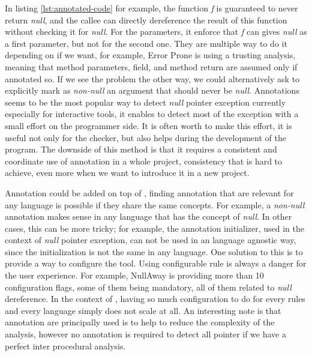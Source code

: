 In listing \ref{lst:annotated-code} for example, the function \emph{f} is guaranteed to never return \emph{null}, and the callee can directly dereference the result of this function without checking it for \emph{null}. 
For the parameters, it enforce that \emph{f} can gives \emph{null} as a first parameter, but not for the second one.\newline
They are multiple way to do it depending on if we want, for example, Error Prone is using a trusting analysis, meaning that method parameters, field, and method return are assumed \nullable{} only if annotated so. 
If we see the problem the other way, we could alternatively ask to explicitly mark as \emph{non-null} an argument that should never be \emph{null}.\newline
Annotations seems to be the most popular way to detect \emph{null} pointer exception currently especially for interactive tools, it enables to detect most of the exception with a small effort on the programmer side. 
It is often worth to make this effort, it is useful not only for the checker, but also helps during the development of the program. 
The downside of this method is that it requires a consistent and coordinate use of annotation in a whole project, consistency that is hard to achieve, even more when we want to introduce it in a new project.

Annotation could be added on top of \slang{}, finding annotation that are relevant for any language is possible if they share the same concepts. 
For example, a \emph{non-null} annotation makes sense in any language that has the concept of \emph{null}. 
In other cases, this can be more tricky; for example, the annotation initializer, used in the context of \emph{null} pointer exception, can not be used in an language agnostic way, since the initialization is not the same in any language.\newline
One solution to this is to provide a way to configure the tool. 
Using configurable rule is always a danger for the user experience. For example, NullAway is providing more than 10 configuration flags, some of them being mandatory, all of them related to \emph{null} dereference. 
In the context of \slang{}, having so much configuration to do for every rules and every language simply does not scale at all.\newline
An interesting note is that annotation are principally used is to help to reduce the complexity of the analysis, however no annotation is required to detect all pointer if we have a perfect inter procedural analysis.


